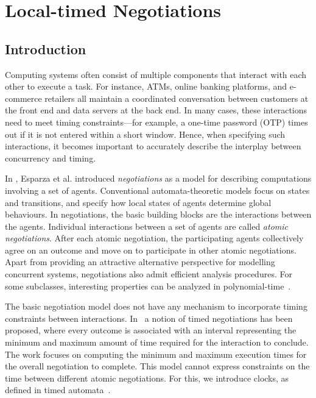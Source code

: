 
\chapter{Local-timed Negotiations}

\section{Introduction}

Computing systems often consist of multiple components that interact with each other to execute a task. For instance, ATMs, online banking platforms, and e-commerce retailers all maintain a coordinated conversation between customers at the front end and data servers at the back end. In many cases, these interactions need to meet timing constraints---for example, a one-time password (OTP) times out if it is not entered within a short window. Hence, when specifying such interactions, it becomes important to accurately describe the interplay between concurrency and timing.

In \cite{DBLP:journals/acta/DeselEH19,DBLP:conf/concur/EsparzaD13}, Esparza et al. introduced \textit{negotiations} as a model for describing computations involving a set of agents. Conventional automata-theoretic models focus on states and transitions, and specify how local states of agents determine global behaviours. In negotiations, the basic building blocks are the interactions between the agents. Individual interactions between a set of agents are called \emph{atomic negotiations}. After each atomic negotiation, the participating agents collectively agree on an outcome and move on to participate in other atomic negotiations. Apart from providing an attractive alternative perspective for modelling concurrent systems, negotiations also admit efficient analysis procedures. For some subclasses, interesting properties can be analyzed in polynomial-time~\cite{DBLP:journals/lmcs/EsparzaKMW18,DBLP:conf/lics/EsparzaMW17}.

The basic negotiation model does not have any mechanism to incorporate timing constraints between interactions. In~\cite{DBLP:conf/fossacs/AkshayGHM20} a notion of timed negotiations has been proposed, where every outcome is associated with an interval representing the minimum and maximum amount of time required for the interaction to conclude. The work focuses on computing the minimum and maximum execution times for the overall negotiation to complete. This model cannot express constraints on the time between different atomic negotiations. For this, we introduce clocks, as defined in timed automata~\cite{DBLP:journals/tcs/AlurD94}.


